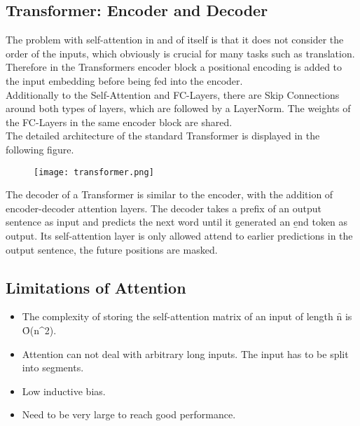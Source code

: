 \subsection{Transformer: Encoder and Decoder}
The problem with self-attention in and of itself is that it does not consider the order of the inputs, which obviously is crucial for many tasks such as translation.\\
Therefore in the Transformers encoder block a positional encoding is added to the input embedding before being fed into the encoder.\\

Additionally to the Self-Attention and FC-Layers, there are Skip Connections around both types of layers, which are followed by a LayerNorm. The weights of the FC-Layers in the same encoder block are shared.\\

The detailed architecture of the standard Transformer is displayed in the following figure.\\

\begin{figure}[ht]
    \centering
    \texttt{[image: transformer.png]}
\end{figure}

The decoder of a Transformer is similar to the encoder, with the addition of encoder-decoder attention layers. The decoder takes a prefix of an output sentence as input and predicts the next word until it generated an \b{end token} as output. Its self-attention layer is only allowed attend to earlier predictions in the output sentence, the future positions are masked.

\subsection{Limitations of Attention}
\begin{itemize}
    \item The complexity of storing the self-attention matrix of an input of length \f{n} is \f{O(n^2)}.
    \item Attention can not deal with arbitrary long inputs. The input has to be split into segments.
    \item Low inductive bias.
    \item Need to be very large to reach good performance.
\end{itemize}